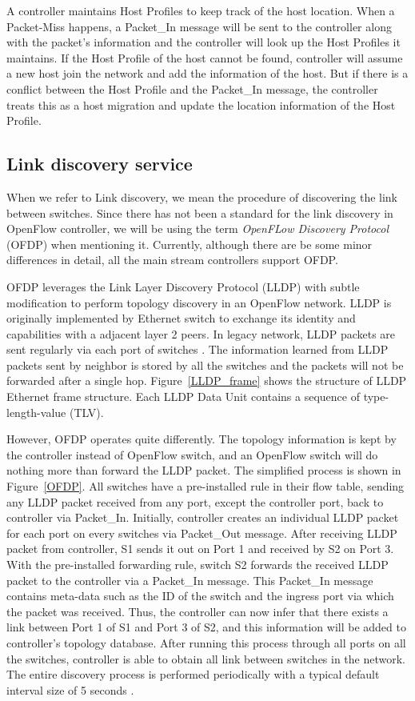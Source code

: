 A controller maintains Host Profiles to keep track of the host location. When a Packet-Miss happens, a Packet\_In message will be sent to the controller along with the packet's information and the controller will look up the Host Profiles it maintains. If the Host Profile of the host cannot be found, controller will assume a new host join the network and add the information of the host. But if there is a conflict between the Host Profile and the Packet\_In message, the controller treats this as a host migration and update the location information of the Host Profile.

\subsection{Link discovery service}
\label{Link discovery service}
When we refer to Link discovery, we mean the procedure of discovering the link between switches. Since there has not been a standard for the link discovery in OpenFlow controller, we will be using the term \textit{OpenFLow Discovery Protocol} (OFDP) when mentioning it. Currently, although there are be some minor differences in detail, all the main stream controllers support OFDP.

OFDP leverages the Link Layer Discovery Protocol (LLDP) with subtle modification to perform topology discovery in an OpenFlow network. LLDP is originally implemented by Ethernet switch to exchange its identity and capabilities with a adjacent layer 2 peers. In legacy network, LLDP packets are sent regularly via each port of switches \cite{LLDP_WS}. The information learned from LLDP packets sent by neighbor is stored by all the switches and the packets will not be forwarded after a single hop. Figure~\ref{LLDP_frame} shows the structure of LLDP Ethernet frame structure. Each LLDP Data Unit contains a sequence of type-length-value (TLV). 

However, OFDP operates quite differently. The topology information is kept by the controller instead of OpenFlow switch, and an OpenFlow switch will do nothing more than forward the LLDP packet. The simplified process is shown in Figure~\ref{OFDP}. All switches have a pre-installed rule in their flow table, sending any LLDP packet received from any port, except the controller port, back to controller via Packet\_In. Initially, controller creates an individual LLDP packet for each port on every switches via Packet\_Out message. After receiving LLDP packet from controller, S1 sends it out on Port 1 and received by S2 on Port 3. With the pre-installed forwarding rule, switch S2 forwards the received LLDP packet to the controller via a Packet\_In message. This Packet\_In message contains meta-data such as the ID of the switch and the ingress port via which the packet was received. Thus, the controller can now infer that there exists a link between Port 1 of S1 and Port 3 of S2, and this information will be added to controller's topology database. After running this process through all ports on all the switches, controller is able to obtain all link between switches in the network. The entire discovery process is performed periodically with a typical default interval size of 5 seconds \cite{PPTI14}. 

